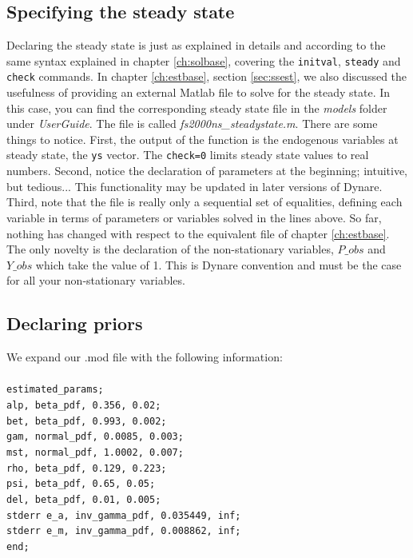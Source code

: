 \subsection{Specifying the steady state}
Declaring the steady state is just as explained in details and according to the same syntax explained in chapter \ref{ch:solbase}, covering the \texttt{initval}, \texttt{steady} and \texttt{check} commands. In chapter \ref{ch:estbase}, section \ref{sec:ssest}, we also discussed the usefulness of providing an external Matlab file to solve for the steady state. In this case, you can find the corresponding steady state file in the \textsl{models} folder under \textsl{UserGuide}. The file is called \textsl{fs2000ns\_steadystate.m}. There are some things to notice. First, the output of the function is the endogenous variables at steady state, the \texttt{ys} vector. The \texttt{check=0} limits steady state values to real numbers. Second, notice the declaration of parameters at the beginning; intuitive, but tedious... This functionality may be updated in later versions of Dynare. Third, note that the file is really only a sequential set of equalities, defining each variable in terms of parameters or variables solved in the lines above. So far, nothing has changed with respect to the equivalent file of chapter \ref{ch:estbase}. The only novelty is the declaration of the non-stationary variables, $P\_obs$ and $Y\_obs$ which take the value of 1. This is Dynare convention and must be the case for all your non-stationary variables. 

\subsection{Declaring priors}
We expand our .mod file with the following information: \\
\\
\texttt{estimated\_params;\\
alp, beta\_pdf, 0.356, 0.02; \\ 
bet, beta\_pdf, 0.993, 0.002; \\
gam, normal\_pdf, 0.0085, 0.003; \\
mst, normal\_pdf, 1.0002, 0.007; \\
rho, beta\_pdf, 0.129, 0.223;\\
psi, beta\_pdf, 0.65, 0.05;\\
del, beta\_pdf, 0.01, 0.005;\\
stderr e\_a, inv\_gamma\_pdf, 0.035449, inf;\\
stderr e\_m, inv\_gamma\_pdf, 0.008862, inf;\\
end;}\\
\\

